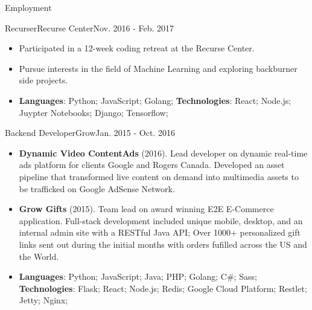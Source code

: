\documentclass[]{mcdowellcv}
\begin{document}
    \makeheader

    \begin{cvsection}{Employment}

        \begin{cvsubsection}{Recurser}{Recurse Center}{Nov. 2016 - Feb. 2017}
            \begin{itemize}
                \item Participated in a 12-week coding retreat at the Recurse Center.
                \item Pursue interests in the field of Machine Learning and exploring backburner side projects.
            \end{itemize}
            \begin{itemize}
                 \item \textbf{Languages}: Python; JavaScript; Golang; \newline
                \textbf{Technologies}: React; Node.js; Juypter Notebooks; Django; Tensorflow;
            \end{itemize}
        \end{cvsubsection}

        \begin{cvsubsection}{Backend Developer}{Grow}{Jan. 2015 - Oct. 2016}
            \begin{itemize}
                \item \textbf{Dynamic Video ContentAds} (2016). Lead developer on dynamic real-time ads platform for clients Google and Rogers Canada. Developed an asset pipeline that transformed live content on demand into multimedia assets to be trafficked on Google AdSense Network.
            \end{itemize}
            \begin{itemize}
                \item \textbf{Grow Gifts} (2015). Team lead on award winning E2E E-Commerce application. Full-stack development included unique mobile, desktop, and an internal admin site with a RESTful Java API; Over 1000+ personalized gift links sent out during the initial months with orders fufilled across the US and the World.
            \end{itemize}
            \begin{itemize}
                 \item \textbf{Languages}: Python; JavaScript; Java; PHP; Golang; C\#; Sass; \newline
                \textbf{Technologies}: Flask; React; Node.js; Redis; Google Cloud Platform; Restlet; Jetty; Nginx;
            \end{itemize}
        \end{cvsubsection}


\end{cvsection}
\end{document}
